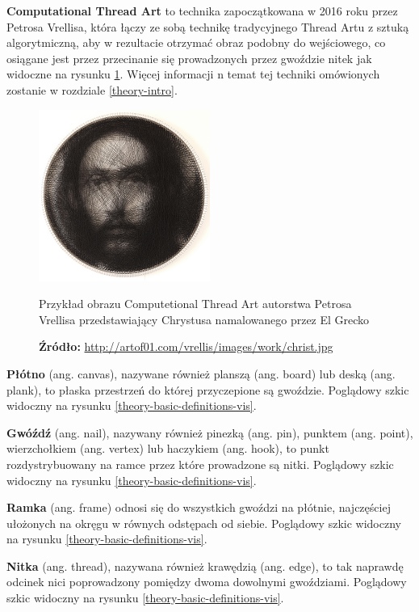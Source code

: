 \documentclass[a4paper, 12pt, polish, twoside]{extreport}
\begin{document}
    \textbf{Computational Thread Art} to technika zapoczątkowana w 2016 roku przez Petrosa Vrellisa, która łączy ze sobą technikę tradycyjnego Thread Artu z sztuką algorytmiczną, aby w rezultacie otrzymać obraz podobny do wejściowego, co osiągane jest przez przecinanie się prowadzonych przez gwoździe nitek jak widoczne na rysunku \ref{theory-computational-thread-art}. Więcej informacji n temat tej techniki omówionych zostanie w rozdziale \ref{theory-intro}.
    \begin{figure}[H]
        \centering
        \includegraphics[width=0.5\textwidth,keepaspectratio]{img/2-theory/christs.png}
        \caption[Przykład obrazu Computetional Thread Art]{Przykład obrazu Computetional Thread Art autorstwa Petrosa Vrellisa przedstawiający Chrystusa namalowanego przez El Grecko }
        \caption*{\footnotesize{\textbf{Źródło:} {\url{http://artof01.com/vrellis/images/work/christ.jpg}}}}
        \label{theory-computational-thread-art}
    \end{figure}
    
    \textbf{Płótno} (ang. canvas), nazywane również planszą (ang. board) lub deską (ang. plank), to płaska przestrzeń do której przyczepione są gwoździe. Poglądowy szkic widoczny na rysunku \ref{theory-basic-definitions-vis}.
    
    \textbf{Gwóźdź} (ang. nail), nazywany również pinezką (ang. pin), punktem (ang. point), wierzchołkiem (ang. vertex) lub haczykiem (ang. hook), to punkt rozdystrybuowany na ramce przez które prowadzone są nitki. Poglądowy szkic widoczny na rysunku \ref{theory-basic-definitions-vis}.
    
    \textbf{Ramka} (ang. frame) odnosi się do wszystkich gwoździ na płótnie, najczęściej ułożonych na okręgu w równych odstępach od siebie. Poglądowy szkic widoczny na rysunku \ref{theory-basic-definitions-vis}.
    
    \textbf{Nitka} (ang. thread), nazywana również krawędzią (ang. edge), to tak naprawdę odcinek nici poprowadzony pomiędzy dwoma dowolnymi gwoździami. Poglądowy szkic widoczny na rysunku \ref{theory-basic-definitions-vis}.
    
\end{document}
